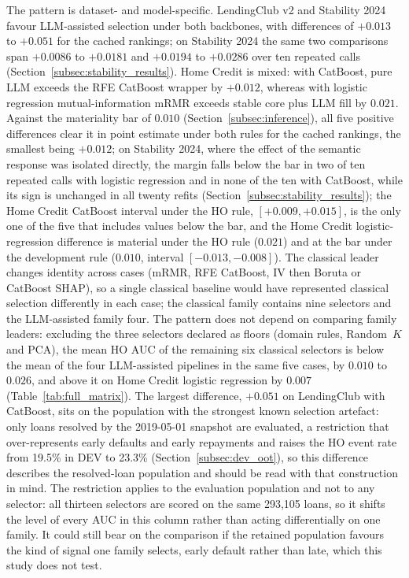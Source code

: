 \documentclass[final,5p,twocolumn]{elsarticle}
\newcommand{\Kfeat}{K}
\begin{document}
The pattern is dataset- and model-specific. LendingClub v2 and Stability 2024 favour LLM-assisted selection under both backbones, with differences of $+0.013$ to $+0.051$ for the cached rankings; on Stability 2024 the same two comparisons span $+0.0086$ to $+0.0181$ and $+0.0194$ to $+0.0286$ over ten repeated calls (Section~\ref{subsec:stability_results}). Home Credit is mixed: with CatBoost, pure LLM exceeds the RFE CatBoost wrapper by $+0.012$, whereas with logistic regression mutual-information mRMR exceeds stable core plus LLM fill by $0.021$. Against the materiality bar of $0.010$ (Section~\ref{subsec:inference}), all five positive differences clear it in point estimate under both rules for the cached rankings, the smallest being $+0.012$; on Stability 2024, where the effect of the semantic response was isolated directly, the margin falls below the bar in two of ten repeated calls with logistic regression and in none of the ten with CatBoost, while its sign is unchanged in all twenty refits (Section~\ref{subsec:stability_results}); the Home Credit CatBoost interval under the HO rule, $[+0.009, +0.015]$, is the only one of the five that includes values below the bar, and the Home Credit logistic-regression difference is material under the HO rule ($0.021$) and at the bar under the development rule ($0.010$, interval $[-0.013, -0.008]$). The classical leader changes identity across cases (mRMR, RFE CatBoost, IV then Boruta or CatBoost SHAP), so a single classical baseline would have represented classical selection differently in each case; the classical family contains nine selectors and the LLM-assisted family four. The pattern does not depend on comparing family leaders: excluding the three selectors declared as floors (domain rules, Random~$\Kfeat$ and PCA), the mean HO AUC of the remaining six classical selectors is below the mean of the four LLM-assisted pipelines in the same five cases, by $0.010$ to $0.026$, and above it on Home Credit logistic regression by $0.007$ (Table~\ref{tab:full_matrix}). The largest difference, $+0.051$ on LendingClub with CatBoost, sits on the population with the strongest known selection artefact: only loans resolved by the 2019-05-01 snapshot are evaluated, a restriction that over-represents early defaults and early repayments and raises the HO event rate from 19.5\% in DEV to 23.3\% (Section~\ref{subsec:dev_oot}), so this difference describes the resolved-loan population and should be read with that construction in mind. The restriction applies to the evaluation population and not to any selector: all thirteen selectors are scored on the same 293,105 loans, so it shifts the level of every AUC in this column rather than acting differentially on one family. It could still bear on the comparison if the retained population favours the kind of signal one family selects, early default rather than late, which this study does not test.
\end{document}
